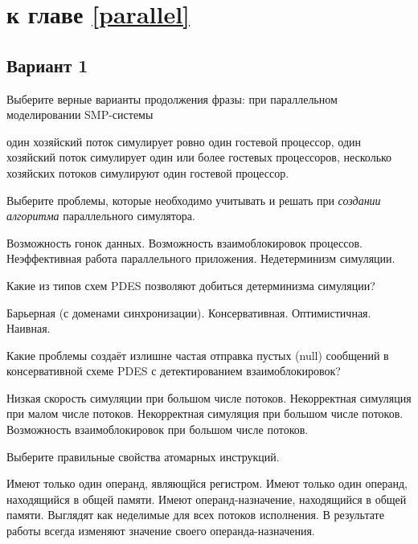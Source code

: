 \section{\Questions к главе \ref{parallel}} %

\subsection*{Вариант 1}

\begin{questions}

\question[3] Выберите верные варианты продолжения фразы: при параллельном моделировании SMP-системы
\begin{choices}
    \choice один хозяйский поток симулирует ровно один гостевой процессор,
    \correctchoice один хозяйский поток симулирует один или более гостевых процессоров,
    \choice несколько хозяйских потоков симулируют один гостевой процессор.
\end{choices}

\question[3] Выберите проблемы, которые необходимо учитывать и решать при \textit{создании алгоритма} параллельного симулятора.
\begin{choices}
    \correctchoice Возможность гонок данных.
    \correctchoice Возможность взаимоблокировок процессов.
    \choice Неэффективная работа параллельного приложения.
    \choice Недетерминизм симуляции.
\end{choices}

\question[3] Какие из типов схем PDES позволяют добиться детерминизма симуляции?
\begin{choices}
    \correctchoice Барьерная (с доменами синхронизации).
    \choice Консервативная.
    \choice Оптимистичная.
    \choice Наивная.
\end{choices}

\question[3] Какие проблемы создаёт излишне частая отправка пустых (null) сообщений в консервативной схеме PDES с детектированием взаимоблокировок?
\begin{choices}
    \correctchoice Низкая скорость симуляции при большом числе потоков.
    \choice Некорректная симуляция при малом числе потоков.
    \choice Некорректная симуляция при большом числе потоков.
    \choice Возможность взаимоблокировок при большом числе потоков.
\end{choices}

\question[3] Выберите правильные свойства атомарных инструкций.
\begin{choices}
    \choice Имеют только один операнд, являющйся регистром.
    \choice Имеют только один операнд, находящийся в общей памяти.
    \correctchoice Имеют операнд-назначение, находящийся в общей памяти.
    \correctchoice Выглядят как неделимые для всех потоков исполнения.
    \choice В результате работы всегда изменяют значение своего операнда-назначения.
\end{choices}


\end{questions}
